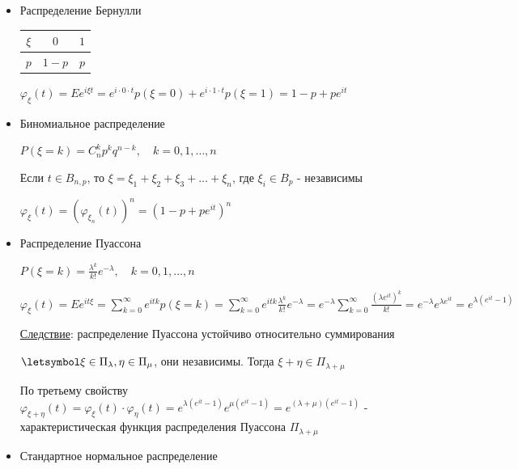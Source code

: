 \documentclass[12pt]{article}
\begin{document}
\begin{itemize}
    \item Распределение Бернулли

    \smallvspace

    \begin{tabular}{c|c|c}
        $\xi$ & $0$     & $1$    \\
        \hline
        $p$   & $1 - p$ & $p$
    \end{tabular}

    \smallvspace

    $\varphi_\xi(t) = Ee^{i\xi t} = e^{i \cdot 0 \cdot t} p(\xi = 0) + e^{i \cdot 1 \cdot t} p(\xi = 1) = 1 - p + p e^{it}$

    \item Биномиальное распределение

    $P(\xi = k) = C_n^k p^k q^{n - k}, \quad k = 0, 1, \dots, n$

    Если $t \in B_{n,p}$, то $\xi = \xi_1 + \xi_2 + \xi_3 + \dots + \xi_n$, где $\xi_i \in B_p$ - независимы

    $\varphi_\xi(t) = (\varphi_{\xi_n}(t))^n = (1 - p + p e^{it})^n$

    \item Распределение Пуассона

    $P(\xi = k) = \frac{\lambda^k}{k!} e^{-\lambda}, \quad k = 0, 1, \dots, n$

    $\varphi_\xi(t) = Ee^{it\xi} = \sum_{k = 0}^\infty e^{itk} p(\xi = k) = \sum_{k = 0}^\infty e^{itk} \frac{\lambda^k}{k!} e^{-\lambda} = 
    e^{-\lambda} \sum_{k = 0}^\infty \frac{(\lambda e^{it})^k}{k!} = e^{-\lambda} e^{\lambda e^{it}} = e^{\lambda (e^{it} - 1)}$

    \underline{Следствие}: распределение Пуассона устойчиво относительно суммирования

    \begin{MyTheorem}
        $\letsymbol \xi \in \Pi_\lambda, \eta \in \Pi_\mu$, они независимы. Тогда $\xi + \eta \in \Pi_{\lambda + \mu}$
    \end{MyTheorem}

    \begin{MyProof}
        По третьему свойству $\varphi_{\xi + \eta}(t) = \varphi_\xi(t) \cdot \varphi_\eta(t) = e^{\lambda(e^{it} - 1)} e^{\mu(e^{it} - 1)} = e^{(\lambda + \mu)(e^{it} - 1)}$ - характеристическая функция распределения Пуассона $\Pi_{\lambda + \mu}$
    \end{MyProof}

    \item Стандартное нормальное распределение


\end{itemize}
\end{document}
